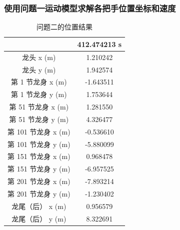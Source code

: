 \documentclass[a4paper]{article}
\begin{document}
        \subsubsection{使用问题一运动模型求解各把手位置坐标和速度}
        
        
        
        \begin{table}[H] %
        	\captionsetup{skip=4pt} %
        	\caption{问题二的位置结果}
        	\centering
        	\setlength{\arrayrulewidth}{0.5pt} %
        	\begin{tabular}{|c|c|} %
        		\hline
        						    & 412.474213 s \\ \hline
        		龙头 x (m)           &  1.210242 \\ \hline 
        		龙头 y (m)           &  1.942574 \\ \hline
        		第 1 节龙身 x (m)    &  -1.643511 \\ \hline 
        		第 1 节龙身 y (m)    &  1.753644 \\ \hline
        		第 51 节龙身 x (m)   &  1.281550 \\ \hline 
        		第 51 节龙身 y (m)   &  4.326477 \\ \hline
        		第 101 节龙身 x (m)  &  -0.536610 \\ \hline 
        		第 101 节龙身 y (m)  &  -5.880099 \\ \hline
        		第 151 节龙身 x (m)  &  0.968478 \\ \hline 
        		第 151 节龙身 y (m)  &  -6.957525 \\ \hline
        		第 201 节龙身 x (m)  &  -7.893214 \\ \hline 
        		第 201 节龙身 y (m)  &  -1.230402 \\ \hline
        		龙尾（后） x (m)     &  0.956579 \\ \hline 
        		龙尾（后） y (m)     &  8.322691 \\ \hline
        	\end{tabular}
        \end{table}
        
\end{document}
